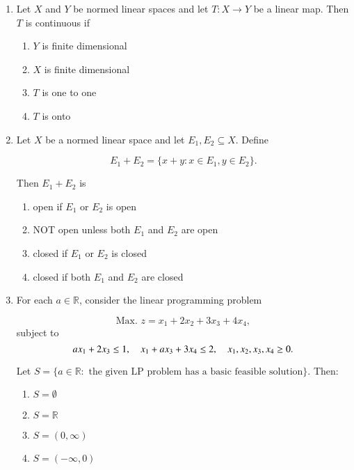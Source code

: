 \documentclass[journal]{IEEEtran}
\numberwithin{figure}{enumi}
\begin{document}
\begin{enumerate}
\item Let $X$ and $Y$ be normed linear spaces and let $T: X \to Y$ be a linear map. Then $T$ is continuous if

\begin{enumerate}
    \item $Y$ is finite dimensional
    \item $X$ is finite dimensional
    \item $T$ is one to one
    \item $T$ is onto
\end{enumerate}
\item Let $X$ be a normed linear space and let $E_1, E_2 \subseteq X$. Define

\begin{equation}
E_1 + E_2 = \{ x+y : x \in E_1, y \in E_2 \}.
\end{equation}

Then $E_1 + E_2$ is

\begin{enumerate}
    \item open if $E_1$ or $E_2$ is open
    \item NOT open unless both $E_1$ and $E_2$ are open
    \item closed if $E_1$ or $E_2$ is closed
    \item closed if both $E_1$ and $E_2$ are closed
\end{enumerate}

\item For each $a \in \mathbb{R}$, consider the linear programming problem

\begin{equation}
\text{Max. } z = x_1 + 2x_2 + 3x_3 + 4x_4,
\end{equation}
subject to
\begin{equation}
a x_1 + 2 x_3 \leq 1,\\ \quad x_1 + a x_3 + 3 x_4 \leq 2,\\ \quad x_1, x_2, x_3, x_4 \geq 0.
\end{equation}

Let $S = \{ a \in \mathbb{R}: \text{ the given LP problem has a basic feasible solution} \}$. Then:

\begin{enumerate}
    \item $S = \emptyset$
    \item $S = \mathbb{R}$
    \item $S = (0, \infty)$
    \item $S = (-\infty, 0)$
\end{enumerate}


\end{enumerate}
\end{document}
